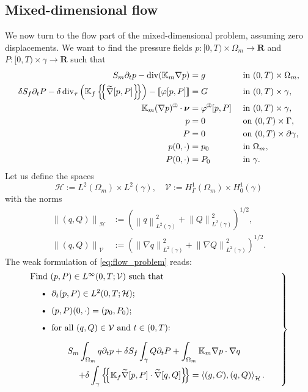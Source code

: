 \documentclass[a4paper]{article}
\def\agrad{\widetilde\nabla}
\def\avg#1{\left\{\mskip-5mu\left\{#1\right\}\mskip-5mu\right\}}
\def\div{\operatorname{div}}
\def\dt{\prtl_t}
\def\dual#1#2{\left\langle #1,#2\right\rangle}
\def\Hf{\mathcal H}
\def\jmp#1{\left\llbracket #1 \right\rrbracket}
\def\nnu{\vc\nu}
\def\norm#1{\left\|#1\right\|}
\def\pphi{{\varphi}}
\def\prtl{\partial}
\def\Real{{\mathbf R}}
\def\tn#1{{\mathbb{#1}}}    %
\def\Vf{{\mathcal V}} %
\def\vc#1{\mathbf{\boldsymbol{#1}}}     %
\newcommand{\eq}[1]{\begin{equation}#1\end{equation}}
\newcommand{\opm}{ %
  {\mathbin{
    \mathchoice
      {\buildcirclepm{\displaystyle     }{0.14ex}{0.95}{0.05ex}{.7}}
      {\buildcirclepm{\textstyle        }{0.14ex}{0.95}{0.05ex}{.7}}
      {\buildcirclepm{\scriptstyle      }{0.13ex}{0.955}{0.04ex}{.55}}
      {\buildcirclepm{\scriptscriptstyle}{0.08ex}{0.95}{0.03ex}{.45}}
  }} 
}
\newcommand\buildcirclepm[5]{%
  \begin{tikzpicture}[baseline=(X.base), inner sep=-#5, outer sep=-.65]
    \node[draw,circle,line width=#4] (X)  {\footnotesize\raisebox{#2}{\scalebox{#3}{$#1\pm$}}};
  \end{tikzpicture}%
}
\begin{document}
\subsection{Mixed-dimensional flow}

We now turn to the flow part of the mixed-dimensional problem, assuming zero displacements.
We want to find the pressure fields $p:[0,T)\times\Omega_m\to\Real$ and $P:[0,T)\times\gamma\to\Real$ such that
\begin{subequations}\label{eq:flow_problem}
\begin{align}
S_m\dt p - \div(\tn K_m\nabla p) &= g &&\mbox{ in }(0,T)\times\Omega_m,\\
\delta S_f\dt P - \delta\div_\tau\left(\tn K_f\avg{\agrad[p,P]}\right) - \jmp{\pphi[p,P]} &= G &&\mbox{ in }(0,T)\times\gamma,\\
\label{eq:condition_pP} \tn K_m(\nabla p)^\opm\cdot\nnu &= \pphi^\opm[p,P] &&\mbox{ in }(0,T)\times\gamma,\\
\label{eq:bc_p} p & = 0 &&\mbox{ on }(0,T)\times\Gamma,\\
\label{eq:bc_P} P & = 0 &&\mbox{ on }(0,T)\times\prtl\gamma,\\
p(0,\cdot) & = p_0 &&\mbox{ in }\Omega_m,\\
\label{eq:init_P} P(0,\cdot) & = P_0 &&\mbox{ in }\gamma.
\end{align}
\end{subequations}
Let us define the spaces
\eq{ \Hf := L^2(\Omega_m)\times L^2(\gamma),\quad \Vf := H^1_\Gamma(\Omega_m)\times H^1_0(\gamma) }
with the norms
\begin{align}
\norm{(q,Q)}_\Hf &:= (\norm{q}_{L^2(\gamma)}^2 + \norm{Q}_{L^2(\gamma)}^2)^{1/2},\\
\norm{(q,Q)}_\Vf &:= (\norm{\nabla q}_{L^2(\gamma)}^2 + \norm{\nabla Q}_{L^2(\gamma)}^2)^{1/2}.
\end{align}
The weak formulation of \eqref{eq:flow_problem} reads:
\eq{ \label{eq:flow_weak} \left.\begin{minipage}{0.85\textwidth}
Find $(p,P)\in L^\infty(0,T;\Vf)$ such that
\begin{itemize}
\item $\dt(p,P)\in L^2(0,T;\Hf)$;
\item $(p,P)(0,\cdot)=(p_0,P_0)$;
\item for all $(q,Q)\in\Vf$ and $t\in(0,T)$:
\[ \begin{aligned}S_m\int_{\Omega_m}q\dt p + \delta S_f\int_\gamma Q\dt P + \int_{\Omega_m}\tn K_m\nabla p\cdot\nabla q\hspace{1cm}\\
+ \delta\int_\gamma\avg{\tn K_f\agrad[p,P]\cdot\agrad[q,Q]}
= \dual{(g,G)}{(q,Q)}_\Hf.\end{aligned} \]
\end{itemize}
\end{minipage}\right\} }
\end{document}

